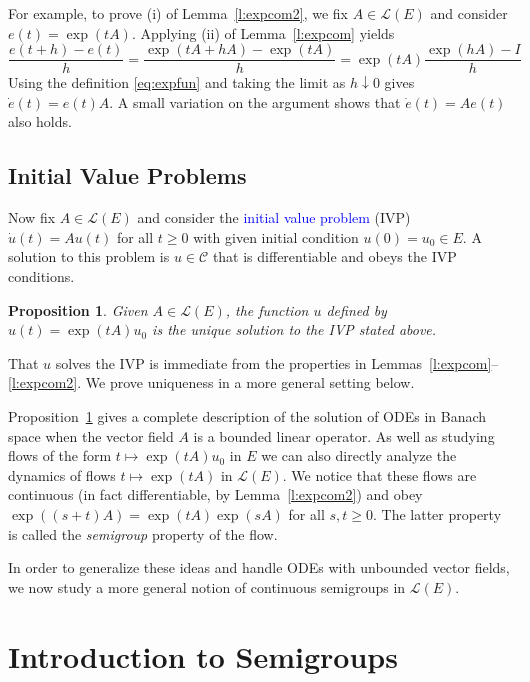 \documentclass[12pt, reqno]{amsart}
\renewcommand{\geq}{\geqslant}
\newcommand{\1}{\mathbbm 1}
\newcommand{\cC}{\mathscr C}
\newcommand{\lL}{\mathcal L}
\theoremstyle{plain}
\newtheorem{proposition}[theorem]{Proposition}
\theoremstyle{definition}
\newcommand{\navy}[1]{\textcolor{blue}{#1}}
\begin{document}
For example, to prove (i) of Lemma~\ref{l:expcom2}, we fix $A \in \lL(E)$ and consider $e(t) = \exp(t
A)$. Applying (ii) of Lemma~\ref{l:expcom} yields
%
\begin{equation*}
    \frac{e(t + h) - e(t)}{h}
    = \frac{\exp(tA + hA) - \exp(tA)}{h}
    = \exp(tA) \frac{\exp(hA) - I}{h}
\end{equation*}
%
Using the definition \eqref{eq:expfun} and taking the limit as $h \downarrow
0$ gives $\dot e(t) = e(t) A $.  A small variation on the argument 
shows that $\dot e(t) = A e(t)$ also holds.


\subsection{Initial Value Problems}\label{ss:boundedivp}

Now fix $A \in \lL(E)$ and consider the \navy{initial value problem} (IVP) $\dot
u(t) = A u(t)$ for all $t \geq 0$ with given initial condition $u(0) = u_0 \in
E$.  A solution to this problem is $u \in \cC$ that is differentiable and 
obeys the IVP conditions.

\begin{proposition}\label{p:expsol}
    Given $A \in \lL(E)$, the function $u$ defined by $u(t) = \exp(tA) u_0$ is
    the unique solution to the IVP stated above.
\end{proposition}

That $u$ solves the IVP is immediate from the properties in
Lemmas~\ref{l:expcom}--\ref{l:expcom2}.  
We prove uniqueness in a more general setting below.

Proposition~\ref{p:expsol} gives a complete description of the solution of ODEs
in Banach space when the vector field $A$ is a bounded linear operator. As
well as studying flows of the form $t \mapsto \exp(tA) u_0$ in $E$ we can also
directly analyze the dynamics of flows $t \mapsto \exp(tA)$ in $\lL(E)$. We
notice that these flows are continuous (in fact differentiable, by
Lemma~\ref{l:expcom2}) and obey $\exp((s + t)A) = \exp(tA) \exp(sA)$ for all $s,
t \geq 0$.  The latter property is called the \emph{semigroup} property of the
flow.  

In order to generalize these ideas and handle ODEs with unbounded vector fields, 
we now study a more general notion of continuous semigroups in $\lL(E)$.


\section{Introduction to Semigroups}
\end{document}
